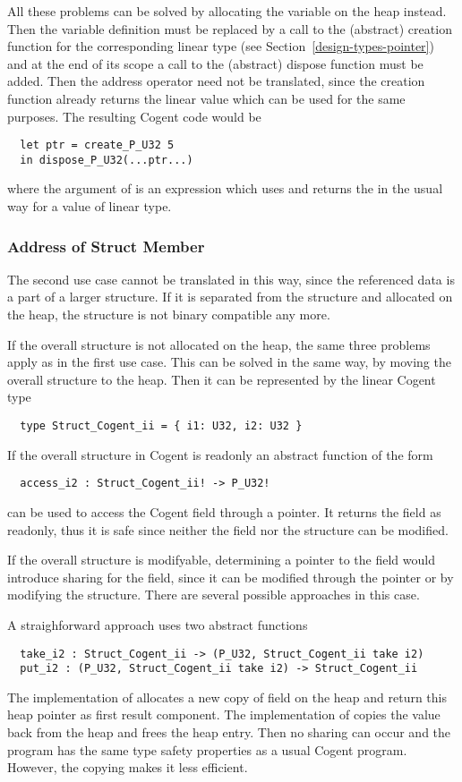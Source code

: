 All these problems can be solved by allocating the variable on the heap instead. Then the variable definition
must be replaced by a call to the (abstract) creation function for the corresponding linear type 
(see Section~\ref{design-types-pointer}) and 
at the end of its scope a call to the (abstract) dispose function must be added. Then the address
operator need not be translated, since the creation function already returns the linear value which can be 
used for the same purposes. The resulting Cogent code would be
\begin{verbatim}
  let ptr = create_P_U32 5
  in dispose_P_U32(...ptr...)
\end{verbatim}
where the argument of  is an expression which uses and returns the  in the 
usual way for a value of linear type.

\subsubsection{Address of Struct Member}

The second use case cannot be translated in this way, since the referenced data is a part of a larger structure.
If it is separated from the structure and allocated on the heap, the structure is not binary compatible any more.

If the overall structure is not allocated on the heap, the same three problems apply as in the first use case.
This can be solved in the same way, by moving the overall structure to the heap. Then it can be represented
by the linear Cogent type
\begin{verbatim}
  type Struct_Cogent_ii = { i1: U32, i2: U32 }
\end{verbatim}

If the overall structure in Cogent is readonly an abstract function of the form
\begin{verbatim}
  access_i2 : Struct_Cogent_ii! -> P_U32!
\end{verbatim}
can be used to access the Cogent field through a pointer. It returns the field as readonly, thus it is safe 
since neither the field nor the structure can be modified.

If the overall structure is modifyable, determining a pointer to the field would introduce sharing for the
field, since it can be modified through the pointer or by modifying the structure. There are several possible
approaches in this case.

A straighforward approach uses two abstract functions
\begin{verbatim}
  take_i2 : Struct_Cogent_ii -> (P_U32, Struct_Cogent_ii take i2)
  put_i2 : (P_U32, Struct_Cogent_ii take i2) -> Struct_Cogent_ii
\end{verbatim}
The implementation of  allocates a new copy of field  on the heap
and return this heap pointer as first result component. The implementation of  copies the 
value back from the heap and frees the heap entry. Then no sharing can occur and the program has the 
same type safety properties as a usual Cogent program. However, the copying makes it less efficient.

